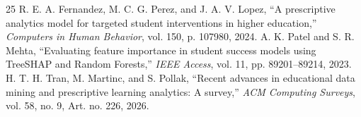 \documentclass[conference]{IEEEtran}
\begin{document}
\begin{thebibliography}{25}
 R. E. A. Fernandez, M. C. G. Perez, and J. A. V. Lopez, ``A prescriptive analytics model for targeted student interventions in higher education,'' \textit{Computers in Human Behavior}, vol. 150, p. 107980, 2024.
 A. K. Patel and S. R. Mehta, ``Evaluating feature importance in student success models using TreeSHAP and Random Forests,'' \textit{IEEE Access}, vol. 11, pp. 89201--89214, 2023.
 H. T. H. Tran, M. Martinc, and S. Pollak, ``Recent advances in educational data mining and prescriptive learning analytics: A survey,'' \textit{ACM Computing Surveys}, vol. 58, no. 9, Art. no. 226, 2026.
\end{thebibliography}
\end{document}
